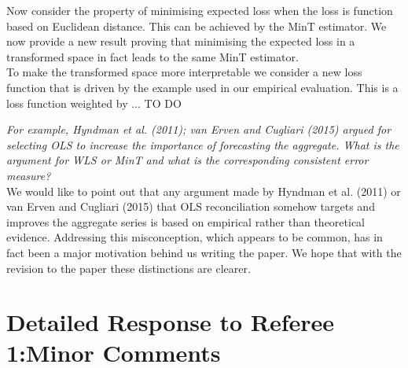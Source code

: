 \documentclass[a4paper,11pt]{article}
\begin{document}
\begin{enumerate}
	    Now consider the property of minimising expected loss when the loss is function based on Euclidean distance.  This can be achieved by the MinT estimator.  We now provide a new result proving that minimising the expected loss in a transformed space in fact leads to the same MinT estimator.\\
	    
	    To make the transformed space more interpretable we consider a new loss function that is driven by the example used in our empirical evaluation.  This is a loss function weighted by ... TO DO
		
		\textit{For example, Hyndman et al. (2011); van Erven and
		Cugliari (2015) argued for selecting OLS to increase the importance of
		forecasting the aggregate. What is the argument for WLS or MinT and
		what is the corresponding consistent error measure?}\\
	    
	    We would like to point out that any argument made by Hyndman et al. (2011) or van Erven and Cugliari (2015) that OLS reconciliation somehow targets and improves the aggregate series is based on empirical rather than theoretical evidence.  Addressing this misconception, which appears to be common, has in fact been a major motivation behind us writing the paper.  We hope that with the revision to the paper these distinctions are clearer.\\
	    
	    \end{enumerate}
	    
	    \section*{Detailed Response to Referee 1:Minor Comments}
	    
\end{document}
